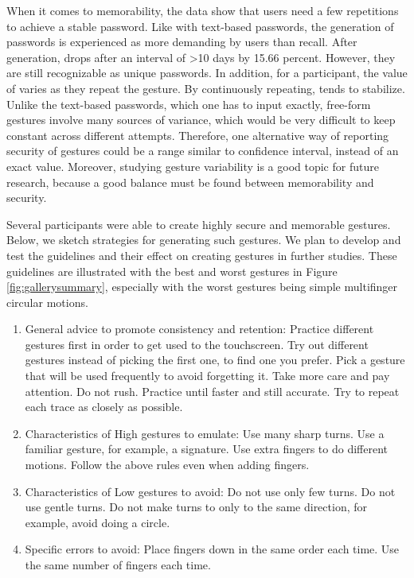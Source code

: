 \documentclass{sig-alternate-10pt}
\begin{document}
When it comes to memorability, the data show that users need a few repetitions to achieve a stable password. Like with text-based passwords, the generation of passwords is experienced as more demanding by users than recall. After generation,  drops after an interval of >10 days by 15.66 percent. However, they are still recognizable as unique passwords. In addition, for a participant, the value of  varies as they repeat the gesture. By continuously repeating,  tends to stabilize. Unlike the text-based passwords, which one has to input exactly, free-form gestures involve many sources of variance, which would be very difficult to keep constant across different attempts. Therefore, one alternative way of reporting security of gestures could be a range similar to confidence interval, instead of an exact value. Moreover, studying gesture variability is a good topic for future research, because a good balance must be found between memorability and security.



Several participants were able to create highly secure and memorable gestures. Below, we sketch strategies for generating such gestures. We plan to develop and test the guidelines and their effect on creating gestures in further studies.
These guidelines are illustrated with the best and worst gestures in Figure \ref{fig:gallerysummary}, especially with the worst gestures being simple multifinger circular motions.


\begin{enumerate}
\item General advice to promote consistency and retention: Practice different gestures first in order to get used to the touchscreen. Try out different gestures instead of picking the first one, to find one you prefer. Pick a gesture that will be used frequently to avoid forgetting it. Take more care and pay attention. Do not rush. Practice until faster and still accurate. Try to repeat each trace as closely as possible.
\item Characteristics of High  gestures to emulate: Use many sharp turns. Use a familiar gesture, for example, a signature. Use extra fingers to do different motions. Follow the above rules even when adding fingers.
\item Characteristics of Low  gestures to avoid: Do not use only few turns. Do not use gentle turns. Do not make turns to only to the same direction, for example, avoid doing a circle. 
\item Specific errors to avoid: Place fingers down in the same order each time. Use the same number of fingers each time.
\end{enumerate}
\end{document}
